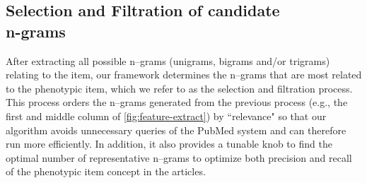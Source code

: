 \documentclass{sig-alternate-05-2015}
\newcommand{\kibitz}[2]{\ifnum\Comments=1\textcolor{#1}{#2}\fi}
\newcommand{\joyce}[1]{\kibitz{purple}      {[Joyce: #1]}}
\newcommand{\jette}[1]{\kibitz{red}      {[Jette: #1]}}
\begin{document}



\subsection{Selection and Filtration of candidate \\n-grams}
After extracting all possible n--grams (unigrams, bigrams and/or trigrams) relating to the item, our framework determines the n--grams that are most related to the phenotypic item, which we refer to as the selection and filtration process.
This process orders the n--grams generated from the previous process (e.g., the first and middle column of \ref{fig:feature-extract}) by ``relevance" so that our algorithm avoids unnecessary queries of the PubMed system and can therefore run more efficiently.
In addition, it also provides a tunable knob to find the optimal number of representative n--grams to optimize both precision and recall of the phenotypic item concept in the articles.
\end{document}
